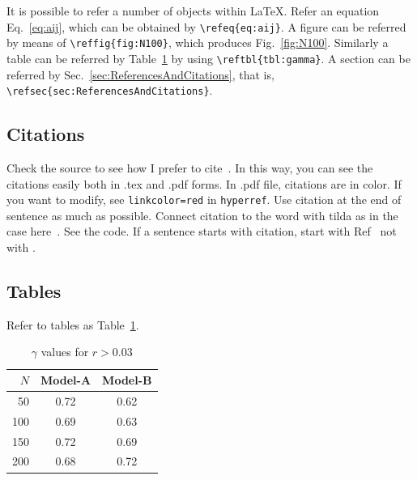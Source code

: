 \documentclass[pre,twocolumn,showkeys,longbibliography]{revtex4-1}
\newcommand{\reffig}[1]{Fig.~\ref{#1}}
\newcommand{\refeq}[1]{Eq.~\ref{#1}}
\newcommand{\reftbl}[1]{Table~\ref{#1}}
\newcommand{\refsec}[1]{Sec.~\ref{#1}}
\newcommand{\refcite}[1]{Ref~\cite{#1}}
\newcommand{\hbCode}[1]{\texttt{#1}}
\theoremstyle{plain}%
\theoremstyle{definition}
\theoremstyle{remark}
\begin{document}
It is possible to refer a number of objects within \LaTeX.
Refer an equation \refeq{eq:aij}, which can be obtained by \verb!\refeq{eq:aij}!. 
A figure can be referred by means of \verb!\reffig{fig:N100}!, which produces \reffig{fig:N100}.
Similarly a table can be referred by \reftbl{tbl:gamma} by using \verb!\reftbl{tbl:gamma}!.
A section can be referred by \refsec{sec:ReferencesAndCitations}, 
that is, 
\verb!\refsec{sec:ReferencesAndCitations}!.



\subsection{Citations}

Check the source to see how I prefer to cite~\cite{%
	duda2012pattern,
	mackay2003information,
	theodoridis2010patternMatlab}.
In this way, you can see the citations easily both in .tex and .pdf forms.
In .pdf file, citations are in color.
If you want to modify,
see 
\hbCode{linkcolor=red}
in 
\hbCode{hyperref}.
Use citation at  the end of sentence as much as possible.
Connect citation to the word with tilda as in the case here~\cite{%
	AAa2017bb}.
See the code.
If a sentence starts with citation,
start with \refcite{%
	AAa2017bb}  
not with \cite{%
	AAa2017bb}.









\subsection{Tables}


Refer to tables as \reftbl{tbl:gamma}.


\begin{table}[th]
	\caption{$\gamma$ values for $r > 0.03$}
	\begin{center}
	\begin{tabular}{|r|cc|}
		\hline
		$N$
		&Model-A %
		&Model-B\\
		\hline
		50
		&0.72
		&0.62\\
		100
		&0.69
		&0.63\\
		150
		&0.72
		&0.69\\
		200
		&0.68
		&0.72\\
		\hline
	\end{tabular}
	\end{center}
	\label{tbl:gamma}
\end{table}%
\end{document}
